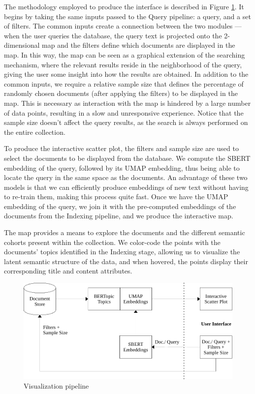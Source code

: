 \documentclass[a4paper]{article}
\begin{document}
The methodology employed to produce the interface is described in Figure \ref{vis_pipeline}. It begins by taking the same inputs passed to the Query pipeline: a query, and a set of filters. The common inputs create a connection between the two modules — when the user queries the database, the query text is projected onto the 2-dimensional map and the filters define which documents are displayed in the map. In this way, the map can be seen as a graphical extension of the searching mechanism, where the relevant results reside in the neighborhood of the query, giving the user some insight into how the results are obtained. In addition to the common inputs, we require a relative sample size that defines the percentage of randomly chosen documents (after applying the filters) to be displayed in the map. This is necessary as interaction with the map is hindered by a large number of data points, resulting in a slow and unresponsive experience. Notice that the sample size doesn't affect the query results, as the search is always performed on the entire collection.

To produce the interactive scatter plot, the filters and sample size are used to select the documents to be displayed from the database. We compute the SBERT embedding of the query, followed by its UMAP embedding, thus being able to locate the query in the same space as the documents. An advantage of these two models is that we can efficiently produce embeddings of new text without having to re-train them, making this process quite fast. Once we have the UMAP embedding of the query, we join it with the pre-computed embeddings of the documents from the Indexing pipeline, and we produce the interactive map.

The map provides a means to explore the documents and the different semantic cohorts present within the collection. We color-code the points with the documents' topics identified in the Indexing stage, allowing us to visualize the latent semantic structure of the data, and when hovered, the points display their corresponding title and content attributes.

\begin{figure}[H]
  \centering
  \includegraphics[scale=0.7]{./assets/vis_pipeline}
  \caption{Visualization pipeline}
  \label{vis_pipeline}
\end{figure}
\end{document}
